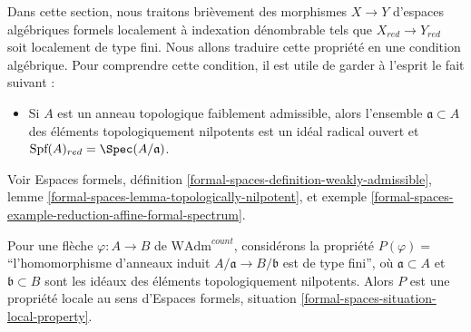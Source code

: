 \noindent
Dans cette section, nous traitons brièvement des morphismes $X \to Y$
d'espaces algébriques formels localement à indexation dénombrable tels que
$X_{red} \to Y_{red}$ soit localement de type fini. Nous allons traduire
cette propriété en une condition algébrique. Pour comprendre cette condition,
il est utile de garder à l'esprit le fait suivant :
\begin{itemize}
\item Si $A$ est un anneau topologique faiblement admissible, alors l'ensemble
$\mathfrak a \subset A$ des éléments topologiquement nilpotents
est un idéal radical ouvert et
$\text{Spf}(A)_{red} = \Spec(A/\mathfrak a)$.
\end{itemize}
Voir Espaces formels, définition
\ref{formal-spaces-definition-weakly-admissible},
lemme \ref{formal-spaces-lemma-topologically-nilpotent}, et
exemple \ref{formal-spaces-example-reduction-affine-formal-spectrum}.

\begin{lemma}
\label{lemma-finite-type-red}
Pour une flèche $\varphi : A \to B$ de $\text{WAdm}^{count}$, considérons
la propriété $P(\varphi)=$``l'homomorphisme d'anneaux induit
$A/\mathfrak a \to B/\mathfrak b$ est de type fini'',
où $\mathfrak a \subset A$ et $\mathfrak b \subset B$ sont les idéaux
des éléments topologiquement nilpotents. Alors $P$ est une propriété locale
au sens d'Espaces formels, situation
\ref{formal-spaces-situation-local-property}.
\end{lemma}

